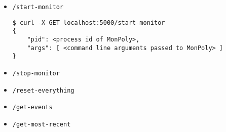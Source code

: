 \begin{itemize}
\begin{verbatim}
{"signature":"<contents of signature file>"}
    \end{verbatim}
    \item \texttt{/start-monitor}
    \begin{verbatim}
$ curl -X GET localhost:5000/start-monitor      
{
    "pid": <process id of MonPoly>,
    "args": [ <command line arguments passed to MonPoly> ]
}
    \end{verbatim}
    \item \texttt{/stop-monitor}
    \item \texttt{/reset-everything}
    \item \texttt{/get-events}
    \item \texttt{/get-most-recent}

\end{itemize}